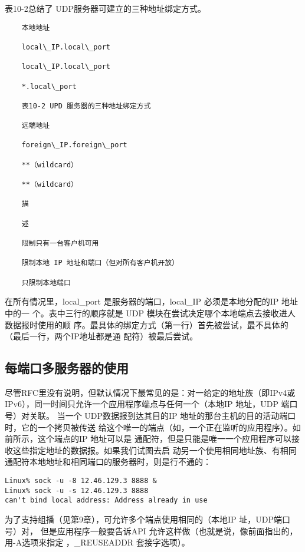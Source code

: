 表10-2总结了 UDP服务器可建立的三种地址绑定方式。

\begin{verbatim}
    本地地址
    
    local\_IP.local\_port
    
    local\_IP.local\_port
    
    *.local\_port
    
    表10-2 UPD 服务器的三种地址绑定方式
    
    远端地址
    
    foreign\_IP.foreign\_port
    
    **（wildcard）
    
    **（wildcard）
    
    描
    
    述
    
    限制只有一台客户机可用
    
    限制本地 IP 地址和端口（但对所有客户机开放）
    
    只限制本地端口
\end{verbatim}

在所有情况里，local\_port 是服务器的端口，local\_IP 必须是本地分配的IP 地址中的一
个。表中三行的顺序就是 UDP 模块在尝试决定哪个本地端点去接收进人数据报时使用的顺
序。最具体的绑定方式（第一行）首先被尝试，最不具体的（最后一行，两个IP地址都是通
配符）被最后尝试。

\subsection{每端口多服务器的使用}
尽管RFC里没有说明，但默认情况下最常见的是：对一给定的地址族（即IPv4或
IPv6），同一时间只允许一个应用程序端点与任何一个（本地IP 地址，UDP 端口号）对关联。
当一个 UDP数据报到达其目的IP 地址的那台主机的目的活动端口时，它的一个拷贝被传送
给这个唯一的端点（如，一个正在监听的应用程序）。如前所示，这个端点的IP 地址可以是
通配符，但是只能是唯一一个应用程序可以接收这些指定地址的数据报。如果我们试图去启
动另一个使用相同地址族、有相同通配符本地地址和相同端口的服务器时，则是行不通的：

\begin{verbatim}
Linux% sock -u -8 12.46.129.3 8888 &
Linux% sock -u -s 12.46.129.3 8888
can't bind local address: Address already in use
\end{verbatim}

为了支持组播（见第9章），可允许多个端点使用相同的（本地IP 址，UDP端口号）对，
但是应用程序一般要告诉API 允许这样做（也就是说，像前面指出的，用-A选项来指定
，\_REUSEADDR 套接字选项）。

